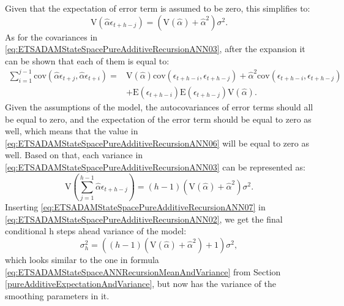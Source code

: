 \documentclass[
]{book}
\theoremstyle{definition}
\theoremstyle{definition}
\theoremstyle{definition}
\theoremstyle{definition}
\theoremstyle{remark}
\begin{document}
Given that the expectation of error term is assumed to be zero, this simplifies to:
\begin{equation}
    \mathrm{V} \left(\hat{\alpha} \epsilon_{t+h-j}\right) = \left(\mathrm{V} (\hat{\alpha}) + \hat{\alpha}^2 \right) \sigma^2.
  \label{eq:ETSADAMStateSpacePureAdditiveRecursionANN05}
\end{equation}
As for the covariances in \eqref{eq:ETSADAMStateSpacePureAdditiveRecursionANN03}, after the expansion it can be shown that each of them is equal to:
\begin{equation}
    \begin{aligned}
    \sum_{i=1}^{j-1} \mathrm{cov}(\hat{\alpha} \epsilon_{t+j},\hat{\alpha} \epsilon_{t+i}) = & \mathrm{V}(\hat{\alpha}) \mathrm{cov}(\epsilon_{t+h-i},\epsilon_{t+h-j}) + \hat{\alpha}^2 \mathrm{cov}(\epsilon_{t+h-i},\epsilon_{t+h-j}) \\
    & + \mathrm{E}(\epsilon_{t+h-i}) \mathrm{E}(\epsilon_{t+h-j}) \mathrm{V}(\hat{\alpha}).
    \end{aligned}
  \label{eq:ETSADAMStateSpacePureAdditiveRecursionANN06}
\end{equation}
Given the assumptions of the model, the autocovariances of error terms should all be equal to zero, and the expectation of the error term should be equal to zero as well, which means that the value in \eqref{eq:ETSADAMStateSpacePureAdditiveRecursionANN06} will be equal to zero as well. Based on that, each variance in \eqref{eq:ETSADAMStateSpacePureAdditiveRecursionANN03} can be represented as:
\begin{equation}
    \mathrm{V} \left(\sum_{j=1}^{h-1} \hat{\alpha} \epsilon_{t+h-j} \right) = (h-1) \left(\mathrm{V} (\hat{\alpha}) + \hat{\alpha}^2 \right) \sigma^2 .
  \label{eq:ETSADAMStateSpacePureAdditiveRecursionANN07}
\end{equation}
Inserting \eqref{eq:ETSADAMStateSpacePureAdditiveRecursionANN07} in \eqref{eq:ETSADAMStateSpacePureAdditiveRecursionANN02}, we get the final conditional h steps ahead variance of the model:
\begin{equation}
    \sigma^2_h = \left((h-1) \left(\mathrm{V} (\hat{\alpha}) + \hat{\alpha}^2 \right) + 1\right) \sigma^2,
  \label{eq:ETSADAMStateSpacePureAdditiveRecursionANNFinal}
\end{equation}
which looks similar to the one in formula \eqref{eq:ETSADAMStateSpaceANNRecursionMeanAndVariance} from Section \ref{pureAdditiveExpectationAndVariance}, but now has the variance of the smoothing parameters in it.
\end{document}
